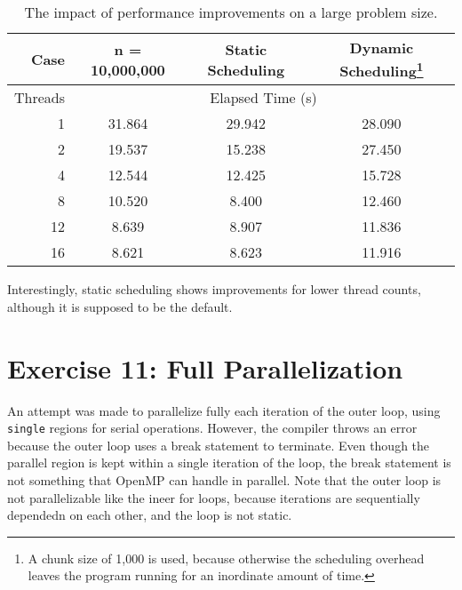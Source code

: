 \documentclass{article}
\begin{document}
\begin{table}[h!]
	\centering
	\caption{The impact of performance improvements on a large problem size.}
	\label{tbl:speedup}
	\begin{tabular}{r|ccc}
		Case & n = 10,000,000 & Static Scheduling & Dynamic Scheduling\footnote{A chunk size of 1,000 is used, because otherwise the scheduling overhead leaves the program running for an inordinate amount of time.} \\
		\hline
		Threads & \multicolumn{3}{c}{Elapsed Time (s)} \\
		\hline
		1 & 31.864 & 29.942 & 28.090 \\
		2 & 19.537 & 15.238 & 27.450 \\
		4 & 12.544 & 12.425 & 15.728 \\
		8 & 10.520 & 8.400 & 12.460 \\
		12 & 8.639 & 8.907 & 11.836 \\
		16 & 8.621 & 8.623 & 11.916
	\end{tabular}
\end{table}

Interestingly, static scheduling shows improvements for lower thread counts, although it is supposed to be the default. 

\section{Exercise 11: Full Parallelization}

An attempt was made to parallelize fully each iteration of the outer loop, using \verb|single| regions for serial operations. However, the compiler throws an error because the outer loop uses a break statement to terminate. Even though the parallel region is kept within a single iteration of the loop, the break statement is not something that OpenMP can handle in parallel. Note that the outer loop is not parallelizable like the ineer for loops, because iterations are sequentially dependedn on each other, and the loop is not static.
\end{document}
